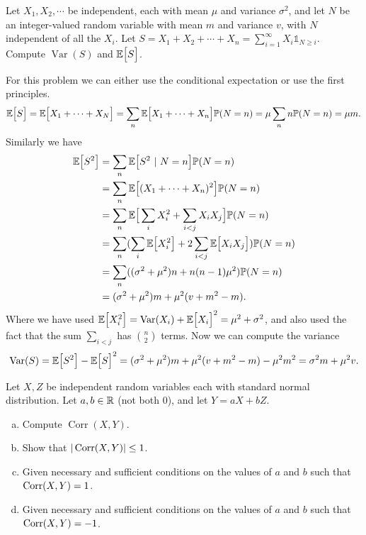 \begin{problem}
	Let $ X_1,X_2,\cdots $ be independent, each with mean $ \mu $ and variance $ \sigma^2 $, and let $ N $ be an integer-valued random variable with mean $ m $ and variance $ v $, with $ N $ independent of all the $ X_i $. Let $ S = X_1 + X_2 + \cdots + X_n = \sum_{i=1}^{\infty} X_i \mathds{1}_{N\geq i} $. Compute $ \operatorname{Var}(S) $ and $ \mathbb{E}\big[S\big] $.
\end{problem}
\begin{solution}
	For this problem we can either use the conditional expectation or use the first principles.
	\[ \mathbb{E}\big[S\big] = \mathbb{E}\big[X_1+\cdots+X_N\big] = \sum_n \mathbb{E}\big[X_1+\cdots+X_n\big]\mathbb{P}(N = n) = \mu \sum_n n \mathbb{P}(N=n) = \mu m. \] 
	Similarly we have
	\begin{align*}
		\mathbb{E}\big[S^2\big] &= \sum_n \mathbb{E}\big[S^2\ |\ N = n\big] \mathbb{P}(N=n) \\
		&= \sum_n \mathbb{E}\big[(X_1+\cdots+X_n)^2\big] \mathbb{P}(N=n) \\
		&= \sum_n \mathbb{E}\big[\sum_i X_i^2 + \sum_{i<j}X_iX_j\big] \mathbb{P}(N=n) \\ 
		&= \sum_n (\sum_i \mathbb{E}\big[X_i^2\big] + 2\sum_{i<j}\mathbb{E}\big[X_iX_j\big]) \mathbb{P}(N=n) \\
		&= \sum_n ((\sigma^2 + \mu^2)n + n(n-1)\mu^2) \mathbb{P}(N=n)\\
		&= (\sigma^2 + \mu^2)m + \mu^2(v+m^2 - m).
	\end{align*}
	Where we have used $ \mathbb{E}\big[X_i^2\big] = \operatorname{Var}(X_i) + \mathbb{E}\big[X_i\big]^2 = \mu^2 + \sigma^2 $, and also used the fact that the sum $ \sum_{i<j} $ has $ \binom{n}{2} $ terms.
	Now we can compute the variance
	\[ \operatorname{Var}(S) = \mathbb{E}\big[S^2\big] - \mathbb{E}\big[S\big]^2 = (\sigma^2 + \mu^2)m + \mu^2(v+m^2 - m) - \mu^2 m^2 = \sigma^2 m + \mu^2 v. \]
\end{solution}
\begin{problem}
	Let $ X,Z $ be independent random variables each with standard normal distribution. Let $ a,b\in \mathbb{R} $ (not both 0), and let $ Y = aX + bZ $.
	\begin{enumerate}[(a)]
		\item Compute $ \operatorname{Corr}(X,Y) $.
		\item Show that $ |\operatorname{Corr}(X,Y)| \leq 1 $.
		\item Given necessary and sufficient conditions on the values of $ a $ and $ b $ such that $ \operatorname{Corr}(X,Y) = 1 $.
		\item Given necessary and sufficient conditions on the values of $ a $ and $ b $ such that $ \operatorname{Corr}(X,Y) = -1 $.
	\end{enumerate}
\end{problem}

